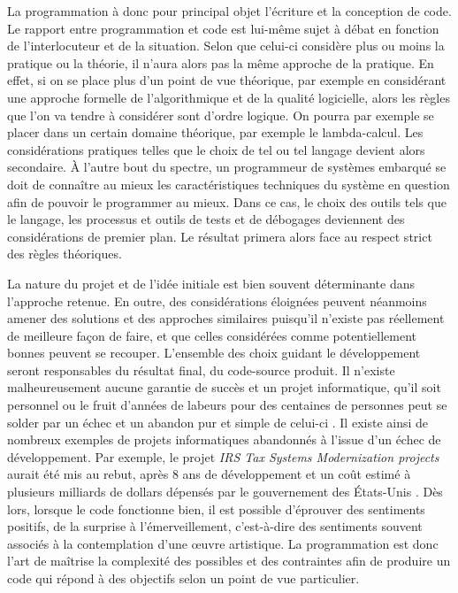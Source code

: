 \documentclass[12pt]{article} %
\begin{document}
La programmation à donc pour principal objet l'écriture et la conception de code. Le rapport entre programmation et code est lui-même sujet à débat en fonction de l'interlocuteur et de la situation. Selon que celui-ci considère plus ou moins la pratique ou la théorie, il n'aura alors pas la même approche de la pratique. En effet, si on se place plus d'un point de vue théorique, par exemple en considérant une approche formelle de l'algorithmique et de la qualité logicielle, alors les règles que l'on va tendre à considérer sont d'ordre logique. On pourra par exemple se placer dans un certain domaine théorique, par exemple le lambda-calcul. Les considérations pratiques telles que le choix de tel ou tel langage devient alors secondaire. À l'autre bout du spectre, un programmeur de systèmes embarqué se doit de connaître au mieux les caractéristiques techniques du système en question afin de pouvoir le programmer au mieux. Dans ce cas, le choix des outils tels que le langage, les processus et outils de tests et de débogages deviennent des considérations de premier plan. Le résultat primera alors face au respect strict des règles théoriques. 

La nature du projet et de l'idée initiale est bien souvent déterminante dans l'approche retenue. En outre, des considérations éloignées peuvent néanmoins amener des solutions et des approches similaires puisqu'il n'existe pas réellement de meilleure façon de faire, et que celles considérées comme potentiellement bonnes peuvent se recouper. L'ensemble des choix guidant le développement seront responsables du résultat final, du code-source produit. Il n'existe malheureusement aucune garantie de succès et un projet informatique, qu'il soit personnel ou le fruit d'années de labeurs pour des centaines de personnes peut se solder par un échec et un abandon pur et simple de celui-ci \cite{Wikipedia-failedComputerProjects} \cite{YBar-Yam2003}. Il existe ainsi de nombreux exemples de projets informatiques abandonnés à l'issue d'un échec de développement. Par exemple, le projet \textit{\foreignlanguage{english}{IRS Tax Systems Modernization projects}} aurait été mis au rebut, après 8 ans de développement et un coût estimé à plusieurs milliards de dollars dépensés par le gouvernement des États-Unis \cite{GDobocan2020}. Dès lors, lorsque le code fonctionne bien, il est possible d'éprouver des sentiments positifs, de la surprise à l'émerveillement, c'est-à-dire des sentiments souvent associés à la contemplation d'une œuvre artistique. La programmation est donc l'art de maîtrise la complexité des possibles et des contraintes afin de produire un code qui répond à des objectifs selon un point de vue particulier.
\end{document}
